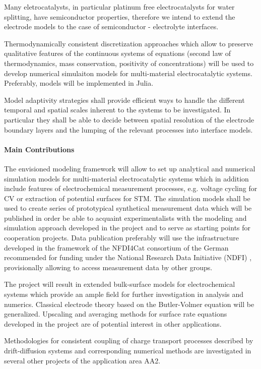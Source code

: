 \documentclass[a4paper,10pt]{article}
\begin{document}
Many eletrocatalysts, in particular platinum free electrocatalysts for water splitting, have semiconductor properties, therefore we intend to extend the electrode models to the case of semiconductor - electrolyte interfaces.

Thermodynamically consistent discretization approaches which allow to preserve qualitative features of the continuous systems of equations  (second law of thermodynamics, mass conservation, positivity of concentrations) will be used to  develop numerical simulaiton models for multi-material electrocatalytic systems.  Preferably, models will be implemented in  Julia.

Model adaptivity strategies shall provide efficient ways to handle the different temporal and spatial scales inherent to the systems to be investigated. In particular they shall be able to decide between spatial resolution of the electrode boundary layers and the lumping of the relevant processes into interface models.


\paragraph{Main Contributions}
The envisioned modeling framework will allow to set up analytical and numerical simulation models for multi-material electrocatalytic systems  which in addition include features of electrochemical measurement processes, e.g. voltage cycling for CV or extraction of potential surfaces for STM.
The simulation  models shall be used to create series of prototypical synthetical measurement data which will be published in order be able to acquaint experimentalists with the modeling and simulation approach developed in the project and to serve as starting points for cooperation projects. Data publication preferably will  use the infrastructure developed in the framework of the NFDI4Cat consortium of the German recommended for funding under the National Research Data Initiative (NDFI) \cite{NFDI4Cat}, provisionally allowing to access measurement data by other groups.

The project will result in extended bulk-surface models for electrochemical systems which provide an ample field for further investigation in analysis and numerics. 
Classical electrode theory based on the Butler-Volmer equation will be generalized.  Upscaling and averaging methods for surface rate equations developed in the project are of potential interest in other applications.

Methodologies for consistent coupling of charge transport processes described by drift-diffusion systems and
corresponding numerical methods are investigated in several other projects of the application area AA2.
\end{document}
